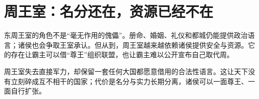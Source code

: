 \section{周王室：名分还在，资源已经不在}

东周王室的角色不是“毫无作用的傀儡”。册命、婚姻、礼仪和都城仍能提供政治语言；诸侯也会争取王室承认。但从到，周王室越来越依赖诸侯提供安全与资源。它的存在让霸主可以借“尊王”组织联盟，也让霸主难以公开宣布自己取代周。

\begin{turningpoint}
周王室失去直接军力，却保留一套任何大国都愿意借用的合法性语言。这让天下没有立刻碎成互不相干的国家；代价是名分与实力长期分离，诸侯可以一面尊王、一面自行扩张。
\end{turningpoint}


